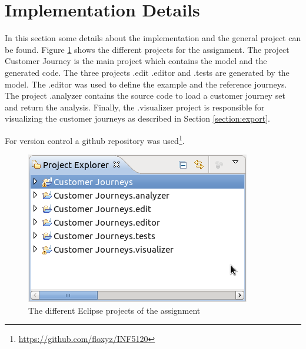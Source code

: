 \documentclass[12pt]{scrartcl}
\begin{document}
\section{Implementation Details}
\label{section:impl}

In this section some details about the implementation and the general project can be found. Figure 
\ref{figure:projects} shows the different projects for the assignment. The project Customer Journey is the main project 
which contains the model and the generated code. The three projects .edit .editor and .tests are generated by the model. 
The .editor was used to define the example and the reference journeys. The project .analyzer contains the source code to 
load a customer journey set and return the analysis. Finally, the .visualizer project is responsible for visualizing the 
customer journeys as described in Section \ref{section:export}.

For version control a github repository was used\footnote{\url{https://github.com/floxyz/INF5120}}.

\begin{figure}[hbtp]
	\centering
	\includegraphics[scale=0.7]{img/projectexplorer.png}
	\caption{The different Eclipse projects of the assignment}
	\label{figure:projects}
\end{figure}
\end{document}
